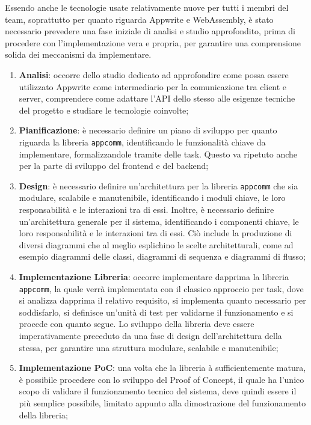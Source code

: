 \documentclass[a4paper, 11pt, twoside]{report}
\begin{document}
Essendo anche le tecnologie usate relativamente nuove per tutti i membri del team, soprattutto per quanto riguarda
\gls{Appwrite} e \gls{WebAssembly}, è stato necessario prevedere una fase iniziale di analisi e studio approfondito,
prima di procedere con l'implementazione vera e propria, per garantire una comprensione solida dei
meccanismi da implementare.

\begin{enumerate}
\item \textbf{Analisi}: occorre dello studio dedicato ad approfondire come possa essere utilizzato \gls{Appwrite}
    come intermediario per la comunicazione tra client e server, comprendere come adattare l'API dello stesso alle esigenze
    tecniche del progetto e studiare le tecnologie coinvolte;

\item \textbf{Pianificazione}: è necessario definire un piano di sviluppo per quanto riguarda la libreria \texttt{appcomm},
    identificando le funzionalità chiave da implementare, formalizzandole tramite delle task. Questo va ripetuto anche
    per la parte di sviluppo del frontend e del backend;

\item \textbf{Design}: è necessario definire un'architettura per la libreria \texttt{appcomm} che sia modulare, scalabile
    e manutenibile, identificando i moduli chiave, le loro responsabilità e le interazioni tra di essi. Inoltre, è
    necessario definire un'architettura generale per il sistema, identificando i componenti chiave, le loro responsabilità
    e le interazioni tra di essi. Ciò include la produzione di diversi diagrammi che al meglio esplichino le scelte
    architetturali, come ad esempio diagrammi delle classi, diagrammi di sequenza e diagrammi di flusso;

\item \textbf{Implementazione Libreria}: occorre implementare dapprima la libreria \texttt{appcomm}, la quale verrà
    implementata con il classico approccio per task, dove si analizza dapprima il relativo requisito, si implementa
    quanto necessario per soddisfarlo, si definisce un'unità di test per validarne il funzionamento e si procede con
    quanto segue. Lo sviluppo della libreria deve essere imperativamente preceduto da una fase di design dell'architettura
    della stessa, per garantire una struttura modulare, scalabile e manutenibile;

\item \textbf{Implementazione PoC}: una volta che la libreria à sufficientemente matura, è possibile procedere con lo
    sviluppo del Proof of Concept, il quale ha l'unico scopo di validare il funzionamento tecnico del sistema, deve
    quindi essere il più semplice possibile, limitato appunto alla dimostrazione del funzionamento della libreria;


\end{enumerate}
\end{document}
